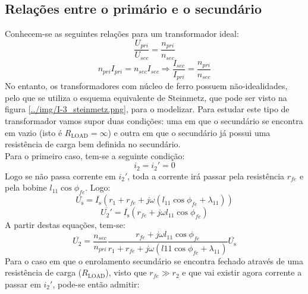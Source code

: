 \documentclass[%
  reprint,
  nofootinbib,
  amsmath,amssymb,
  aps,
  10pt,
]{revtex4-1}
\begin{document}


\subsection{Relações entre o primário e o secundário}
Conhecem-se as seguintes relações para um transformador ideal:
\begin{equation}
\frac{U_{pri}}{U_{sec}}=\frac{n_{pri}}{n_{sec}}
\label{eq:trans_volt}
\end{equation}
\begin{equation}
n_{pri}I_{pri}=n_{sec}I_{sec} \Rightarrow \frac{I_{sec}}{I_{pri}}=\frac{n_{pri}}{n_{sec}}
\label{eq:trans_corr}
\end{equation}
No entanto, os transformadores com núcleo de ferro possuem não-idealidades, pelo que se utiliza o esquema equivalente de Steinmetz, que pode ser visto na figura \ref{../img/I-3_steinmetz.png}, para o modelizar. Para estudar este tipo de transformador vamos supor duas condições: uma em que o secundário se encontra em vazio (isto é $R_{\mathrm{LOAD}}=\infty$) e outra em que o secundário já possui uma resistência de carga bem definida no secundário.\\
Para o primeiro caso, tem-se a seguinte condição:
\begin{equation}
i_2=i_2'=0
\end{equation}
Logo se não passa corrente em $i_2'$, toda a corrente irá passar pela resistência $r_{fe}$ e pela bobine $l_11\cos \phi_{fe}$. Logo:
\begin{equation}
\overline{U_{\mathrm{s}}}=\overline{I_{\mathrm{s}}}(r_1+r_{fe}+j\omega(l_{11}\cos \phi_{fe}+\lambda_{11}))
\end{equation}
\begin{equation}
\overline{U_2'}=\overline{I_{\mathrm{s}}} (r_{fe}+j\omega l_{11}\cos \phi_{fe})
\end{equation}
A partir destas equações, tem-se:
\begin{equation}
\overline{U_2}=\frac{n_{sec}}{n_{pri}}\frac{r_{fe}+j\omega l_{11}\cos \phi_{fe}}{r_1+r_{fe}+j\omega(l11\cos \phi_{fe}+\lambda_{11})}\overline{U_\mathrm{s}}
\label{eq:aberto}
\end{equation}
Para o caso em que o enrolamento secundário se encontra fechado através de uma resistência de carga ($R_{\mathrm{LOAD}}$), visto que $r_{fe}\gg r_2$ e que vai existir agora corrente a passar em $i_2'$, pode-se então admitir:
\end{document}
